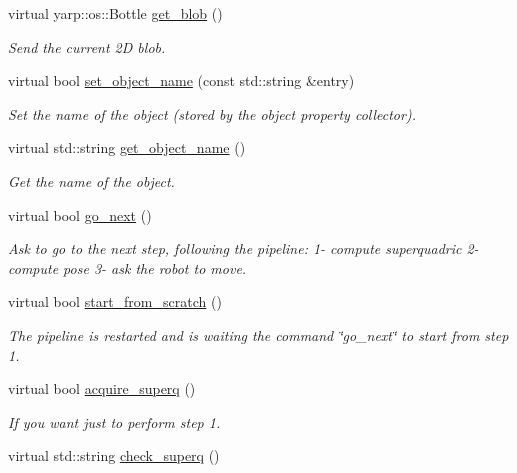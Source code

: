 \begin{DoxyCompactItemize}
\item 
virtual yarp\+::os\+::\+Bottle \hyperlink{classgraspDemo__IDL_a7ad1111fcda1fd6b6759cece23c6e0f4}{get\+\_\+blob} ()
\begin{DoxyCompactList}\small\item\em Send the current 2D blob. \end{DoxyCompactList}\item 
virtual bool \hyperlink{classgraspDemo__IDL_af758a4f305a714b81462a17f0f86e318}{set\+\_\+object\+\_\+name} (const std\+::string \&entry)
\begin{DoxyCompactList}\small\item\em Set the name of the object (stored by the object property collector). \end{DoxyCompactList}\item 
virtual std\+::string \hyperlink{classgraspDemo__IDL_a55b811e44696b496da721da5a9f9beb4}{get\+\_\+object\+\_\+name} ()
\begin{DoxyCompactList}\small\item\em Get the name of the object. \end{DoxyCompactList}\item 
virtual bool \hyperlink{classgraspDemo__IDL_adbfee0a84908c87b633b05e9b5d306c2}{go\+\_\+next} ()
\begin{DoxyCompactList}\small\item\em Ask to go to the next step, following the pipeline\+: 1-\/ compute superquadric 2-\/ compute pose 3-\/ ask the robot to move. \end{DoxyCompactList}\item 
virtual bool \hyperlink{classgraspDemo__IDL_a3ae8ff9135f0b72a12f423a03412e4ee}{start\+\_\+from\+\_\+scratch} ()
\begin{DoxyCompactList}\small\item\em The pipeline is restarted and is waiting the command \char`\"{}go\+\_\+next\char`\"{} to start from step 1. \end{DoxyCompactList}\item 
virtual bool \hyperlink{classgraspDemo__IDL_aed9067a7983154f5189dcd833f376e40}{acquire\+\_\+superq} ()
\begin{DoxyCompactList}\small\item\em If you want just to perform step 1. \end{DoxyCompactList}\item 
virtual std\+::string \hyperlink{classgraspDemo__IDL_a3dd467a705bd6977d6ee7416e439ebdc}{check\+\_\+superq} ()

\end{DoxyCompactItemize}
